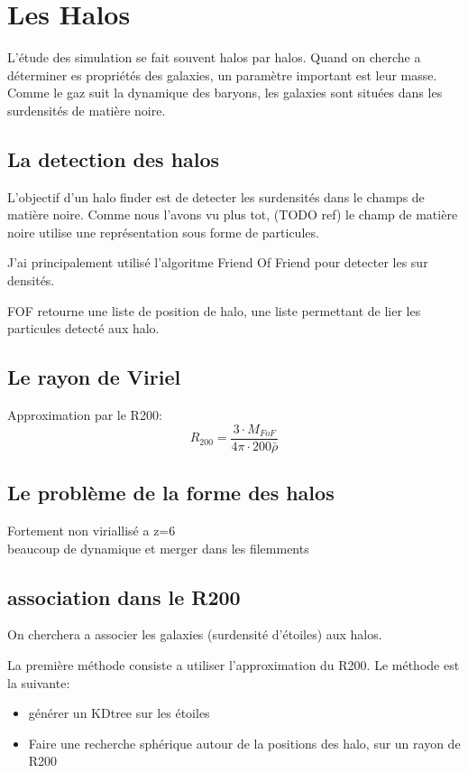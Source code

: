 \chapter{Les Halos}

L'étude des simulation se fait souvent halos par halos.
Quand on cherche a déterminer es propriétés des galaxies, un paramètre important est leur masse.
Comme le gaz suit la dynamique des baryons, les galaxies sont situées dans les surdensités de matière noire.


\section{La detection des halos}

L'objectif d'un halo finder est de detecter les surdensités dans le champs de matière noire.
Comme nous l'avons vu plus tot, (TODO ref) le champ de matière noire utilise une représentation sous forme de particules.

J'ai principalement utilisé l'algoritme Friend Of Friend pour detecter les sur densités.

FOF retourne une liste de position de halo, une liste permettant de lier les particules detecté aux halo.

\section{Le rayon de Viriel}
Approximation par le R200:
\begin{equation}
R_{200}=\frac{3\cdot M_{FoF} }{4\pi\cdot 200 \bar{\rho} }
\end{equation}


\section{Le problème de la forme des halos}
Fortement non viriallisé a z=6\\
beaucoup de dynamique et merger dans les filemments

\section{association dans le R200}

On cherchera a associer les galaxies  (surdensité d'étoiles) aux halos.

La première méthode consiste a utiliser l'approximation du R200.
Le méthode est la suivante:

\begin{itemize}
\item générer un KDtree sur les étoiles
\item Faire une recherche sphérique autour de la positions des halo, sur un rayon de R200
\end{itemize}

